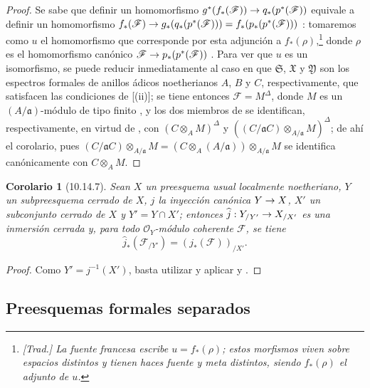 \documentclass[oneside]{amsart}
\theoremstyle{ega-env-style}
\theoremstyle{ega-thm-env-style}
\newtheorem*{corollary}{Corolario}
\theoremstyle{ega-defn-env-style}
\renewcommand{\to}{\mathchoice{\longrightarrow}{\rightarrow}{\rightarrow}{\rightarrow}}
\newcommand{\oldpage}[2][]{{\marginnote{\normalfont{\textbf{#1}~|~#2}}}\ignorespaces}
\let\EGAOriginalLabel\label
\renewcommand{\label}[1]{\phantomsection\EGAOriginalLabel{#1}}
\begin{document}
\begin{proof}
Se sabe que definir un homomorfismo $g^*(f_*(\mathscr{F}))\to q_*(p^*(\mathscr{F}))$ equivale a definir un homomorfismo $f_*(\mathscr{F})\to g_*(q_*(p^*(\mathscr{F})))
=f_*(p_*(p^*(\mathscr{F})))$ :
tomaremos como $u$ el homomorfismo que corresponde por esta adjunción a $f_*(\rho)$,\footnote{\emph{[Trad.] La fuente francesa escribe $u=f_*(\rho)$; estos morfismos viven sobre espacios distintos y tienen haces fuente y meta distintos, siendo $f_*(\rho)$ el adjunto de $u$.}} donde $\rho$ es el homomorfismo canónico $\mathscr{F}\to p_*(p^*(\mathscr{F}))$ .
Para ver que $u$ es un isomorfismo, se puede reducir inmediatamente al caso en que $\mathfrak{S}$, $\mathfrak{X}$ y $\mathfrak{Y}$ son los espectros formales de anillos ádicos noetherianos $A$, $B$ y $C$, respectivamente, que satisfacen las condiciones de [(ii)];
se tiene entonces $\mathscr{F}=M^\Delta$, donde $M$ es un $(A/\mathfrak{a})$-módulo de tipo finito , y los dos miembros de  se identifican, respectivamente, en virtud de , con $(C\otimes_A M)^\Delta$ y $((C/\mathfrak{a}C)\otimes_{A/\mathfrak{a}}M)^\Delta$; de ahí el corolario, pues $(C/\mathfrak{a}C)\otimes_{A/\mathfrak{a}}M
=(C\otimes_A(A/\mathfrak{a}))\otimes_{A/\mathfrak{a}}M$ se identifica canónicamente con $C\otimes_A M$.
\end{proof}

\oldpage[I]{212}
\begin{corollary}[10.14.7]
\label{I.10.14.7}
Sean $X$ un preesquema usual localmente noetheriano, $Y$ un subpreesquema cerrado de $X$, $j$ la inyección canónica $Y\to X$, $X'$ un subconjunto cerrado de $X$ y $Y'=Y\cap X'$;
entonces $\widehat{j}:Y_{/Y'}\to X_{/X'}$ es una inmersión cerrada y, para todo $\mathscr{O}_Y$-módulo coherente $\mathscr{F}$, se tiene
\[
  \widehat{j}_*(\mathscr{F}_{/Y'})=(j_*(\mathscr{F}))_{/X'}.
\]
\end{corollary}

\begin{proof}
Como $Y'=j^{-1}(X')$, basta utilizar  y aplicar  y .
\end{proof}

\subsection{Preesquemas formales separados}
\label{subsection:I.10.15}
\end{document}
